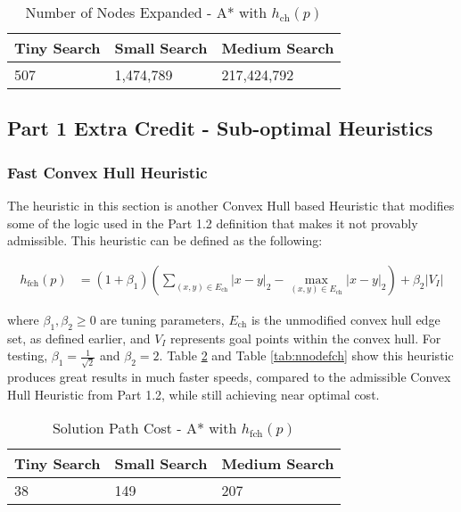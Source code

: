 \documentclass{article}[12pt]
\begin{document}
   \begin{table}[ht]
   \centering
   \begin{tabular}{l | l | l  }
   \hline
    Tiny Search & Small Search & Medium Search\\
    \hline \hline 
   507 & 1,474,789 &  217,424,792\\
   \hline
   \end{tabular}
   \caption{Number of Nodes Expanded - A* with $h_{\text{ch}}(p)$} \label{tab:nnode12}
   \end{table}

   \newpage
   \subsection{Part 1 Extra Credit - Sub-optimal Heuristics}
   \subsubsection{Fast Convex Hull Heuristic}
   The heuristic in this section is another Convex Hull based Heuristic that modifies some of the logic used in the Part 1.2 definition that makes it not provably admissible. This heuristic can be defined as the following:
   
   \begin{align*}
   h_{\text{fch}}(p) &= \left(1 + \beta_1 \right) \left( \sum_{ (x,y) \in E_{\text{ch}} } |x - y|_2 - \max_{ (x,y) \in E_{\text{ch}} } |x - y|_2 \right) + \beta_2 |V_I|
   \end{align*}
   
   where $\beta_1, \beta_2 \geq 0$ are tuning parameters, $E_{\text{ch}}$ is the unmodified convex hull edge set, as defined earlier, and $V_I$ represents goal points within the convex hull. For testing, $\beta_1 = \frac{1}{\sqrt{2}}$ and $\beta_2 = 2$. Table \ref{tab:solfch} and Table \ref{tab:nnodefch} show this heuristic produces great results in much faster speeds, compared to the admissible Convex Hull Heuristic from Part 1.2, while still achieving near optimal cost.
   
   
\begin{table}[ht]
   \centering
   \begin{tabular}{l | l | l  }
   \hline
    Tiny Search & Small Search & Medium Search\\
    \hline \hline 
   38 & 149 & 207 \\
   \hline
   \end{tabular}
   \caption{Solution Path Cost - A* with $h_{\text{fch}}(p)$} \label{tab:solfch}
   \end{table}
   
\end{document}
